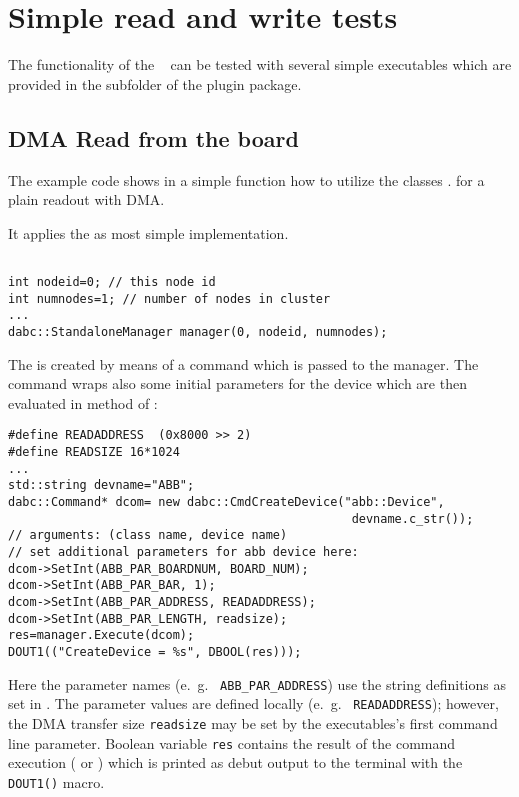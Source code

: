 \section{Simple read and write tests}
\label{prog_exapci_simpletest}
The functionality of the \ABB~ can be tested with several simple
executables which are provided in the  subfolder of the
 plugin package.

\subsection{DMA Read from the board}
\label{prog_exapci_simpletest_read}
The example code  shows in a
simple  function how to utilize the
 classes 
. 
for a plain readout with DMA.
\begin{compactenum} 

\item It applies the  as most simple
 implementation.
\begin{verbatim}

int nodeid=0; // this node id
int numnodes=1; // number of nodes in cluster
...
dabc::StandaloneManager manager(0, nodeid, numnodes);
\end{verbatim}

\item The  is created by means of a command
 which is passed to the manager. The 
command wraps also some initial
parameters for the device which are then evaluated in 
method  of :

\begin{verbatim}
#define READADDRESS  (0x8000 >> 2)
#define READSIZE 16*1024
...
std::string devname="ABB";
dabc::Command* dcom= new dabc::CmdCreateDevice("abb::Device", 
                                                devname.c_str());
// arguments: (class name, device name)
// set additional parameters for abb device here:
dcom->SetInt(ABB_PAR_BOARDNUM, BOARD_NUM);
dcom->SetInt(ABB_PAR_BAR, 1);
dcom->SetInt(ABB_PAR_ADDRESS, READADDRESS);
dcom->SetInt(ABB_PAR_LENGTH, readsize);
res=manager.Execute(dcom);
DOUT1(("CreateDevice = %s", DBOOL(res)));
\end{verbatim}

Here the parameter names (e.~g.~ {\tt ABB\_PAR\_ADDRESS}) use
the string definitions as set in . The
parameter values are defined locally (e.~g.~ {\tt READADDRESS});
however, the DMA transfer size {\tt readsize} may be set by
the executables's first command line parameter. 
Boolean variable {\tt res} contains the result 
of the command execution ( or ) which is
printed as debut output to the terminal with the {\tt DOUT1()} macro. 


\end{compactenum}
